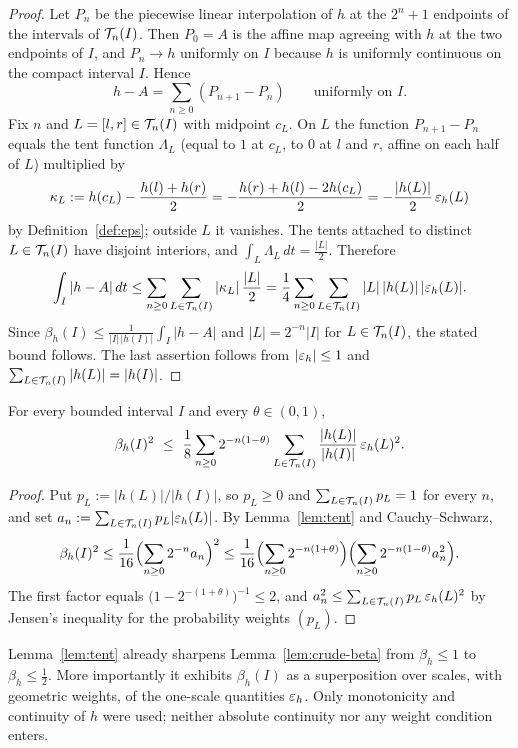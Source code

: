 \begin{proof}
	Let $P_n$ be the piecewise linear interpolation of $h$ at the $2^n+1$ endpoints
	of the intervals of $\mathcal{T}_n(I)$. Then $P_0=A$ is the affine map agreeing with
	$h$ at the two endpoints of $I$, and $P_n\to h$ uniformly on $I$ because $h$ is
	uniformly continuous on the compact interval $I$. Hence
	\[
	h-A=\sum_{n\ge0}(P_{n+1}-P_n)\qquad\text{uniformly on }I .
	\]
	Fix $n$ and $L=[l,r]\in\mathcal{T}_n(I)$ with midpoint $c_L$. On $L$ the function
	$P_{n+1}-P_n$ equals the tent function $\Lambda_L$ (equal to $1$ at $c_L$, to
	$0$ at $l$ and $r$, affine on each half of $L$) multiplied by
	\[
	\kappa_L:=h(c_L)-\frac{h(l)+h(r)}2=-\frac{h(r)+h(l)-2h(c_L)}2
	=-\frac{|h(L)|}{2}\,\varepsilon_h(L)
	\]
	by Definition~\ref{def:eps}; outside $L$ it vanishes. The tents attached to
	distinct $L\in\mathcal{T}_n(I)$ have disjoint interiors, and
	$\int_L\Lambda_L\,dt=\tfrac{|L|}2$. Therefore
	\[
	\int_I|h-A|\,dt\le\sum_{n\ge0}\sum_{L\in\mathcal{T}_n(I)}|\kappa_L|\,\frac{|L|}2
	=\frac14\sum_{n\ge0}\sum_{L\in\mathcal{T}_n(I)}|L|\,|h(L)|\,|\varepsilon_h(L)| .
	\]
	Since $\beta_h(I)\le\frac1{|I|\,|h(I)|}\int_I|h-A|$ and $|L|=2^{-n}|I|$ for
	$L\in\mathcal{T}_n(I)$, the stated bound follows. The last assertion follows from
	$|\varepsilon_h|\le1$ and $\sum_{L\in\mathcal{T}_n(I)}|h(L)|=|h(I)|$.
\end{proof}

\begin{lemma}\label{lem:tent2}
	\leanok
	For every bounded interval $I$ and every $\theta\in(0,1)$,
	\[
	\beta_h(I)^2\ \le\ \frac18\sum_{n\ge0}2^{-n(1-\theta)}
	\sum_{L\in\calT_n(I)}\frac{|h(L)|}{|h(I)|}\,\eps_h(L)^2 .
	\]
\end{lemma}

\begin{proof}
	Put $p_L:=|h(L)|/|h(I)|$, so $p_L\ge0$ and $\sum_{L\in\mathcal{T}_n(I)}p_L=1$ for
	every $n$, and set $a_n:=\sum_{L\in\mathcal{T}_n(I)}p_L|\varepsilon_h(L)|$. By
	Lemma~\ref{lem:tent} and Cauchy--Schwarz,
	\[
	\beta_h(I)^2\le\frac1{16}\Bigl(\sum_{n\ge0}2^{-n}a_n\Bigr)^{2}
	\le\frac1{16}\Bigl(\sum_{n\ge0}2^{-n(1+\theta)}\Bigr)
	\Bigl(\sum_{n\ge0}2^{-n(1-\theta)}a_n^2\Bigr).
	\]
	The first factor equals $\bigl(1-2^{-(1+\theta)}\bigr)^{-1}\le2$, and
	$a_n^2\le\sum_{L\in\mathcal{T}_n(I)}p_L\,\varepsilon_h(L)^2$ by Jensen's inequality for the
	probability weights $(p_L)$.
\end{proof}

\begin{remark}
	Lemma~\ref{lem:tent} already sharpens Lemma~\ref{lem:crude-beta} from
	$\beta_h\le1$ to $\beta_h\le\frac12$. More importantly it exhibits $\beta_h(I)$
	as a superposition over scales, with geometric weights, of the one-scale
	quantities $\varepsilon_h$. Only monotonicity and continuity of $h$ were used; neither
	absolute continuity nor any weight condition enters.
\end{remark}

